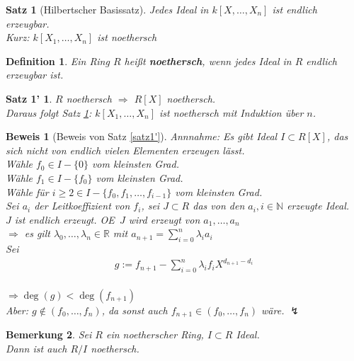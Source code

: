 \documentclass[a4paper,12pt]{report}
\theoremstyle{break}
\newtheorem{Satz}{Satz}
\newtheorem{Def}{Definition}[section]
\newtheorem{Bem}[Def]{Bemerkung}
\theoremstyle{nonumberbreak}
\newtheorem{nnSatz1}{Satz 1'} %
\newtheorem{Bew}{Beweis}
\theoremstyle{nonumberplain}
\newcommand{\emp}[1]{\textbf{\emph{#1}}}
\newcommand{\begriff}[1]{{\index{#1}}\emp{#1}}
\newcommand{\R}{\mathbb{R}}
\newcommand{\N}{\mathbb{N}}
\renewcommand{\OE}{O\!\!E~}
\begin{document}
\begin{Satz}[Hilbertscher Basissatz]\label{satz1}
Jedes Ideal in $k[X,\dots ,X_n]$ ist endlich erzeugbar.\\
\emph{Kurz:}	$k[X_1,\dots, X_n]$ ist noethersch
\end{Satz}

\begin{Def}
Ein Ring $R$ hei\ss t \begriff{noethersch}, wenn jedes Ideal in $R$ endlich erzeugbar ist.
\end{Def}

\begin{nnSatz1}\label{satz1}
$R$ noethersch $\Rightarrow$ $R[X]$ noethersch.\\
Daraus folgt Satz \ref{satz1}: $k[X_1,\dots ,X_n]$ ist noethersch mit Induktion \"uber $n$.
\end{nnSatz1}

\begin{Bew}[Beweis von Satz \ref{satz1'}]
\emph{Annnahme:} Es gibt Ideal $I\subset R[X]$, das sich nicht von endlich vielen Elementen erzeugen l\"asst.\\
W\"ahle $f_0 \in I-\{0\}$ vom kleinsten Grad.\\
W\"ahle $f_1 \in I-\{f_0\}$ vom kleinsten Grad.\\
W\"ahle f\"ur $i\ge2\in I-\{f_0,f_1,\dots ,f_{i-1}\}$ vom kleinsten Grad.\\
Sei $a_i$ der Leitkoeffizient von $f_i$, sei $J\subset R$ das von den $a_i,i\in \N$ erzeugte Ideal.\\
$J$ ist endlich erzeugt. \OE $J$ wird erzeugt von $a_1,\dots ,a_n$\\
$\Rightarrow$ es gilt $\lambda_0,\dots ,\lambda_n \in \R$ mit $a_{n+1}=\sum_{i=0}^n\lambda_i a_i$\\
Sei \begin{align*}g:= f_{n+1}-\sum_{i=0}^n \lambda_i f_i X^{d_{n+1}-d_i}\end{align*}\\
$\Rightarrow \deg(g) <\deg(f_{n+1})$\\
\emph{Aber}: $g\notin (f_0,\dots ,f_n)$, da sonst auch $f_{n+1} \in(f_0,\dots ,f_n)$ w\"are. $\lightning$
\end{Bew}

\begin{Bem}\label{bem1.8}
Sei $R$ ein noetherscher Ring, $I\subset R$ Ideal.\\
Dann ist auch $R/I$ noethersch.
\end{Bem}
\end{document}
